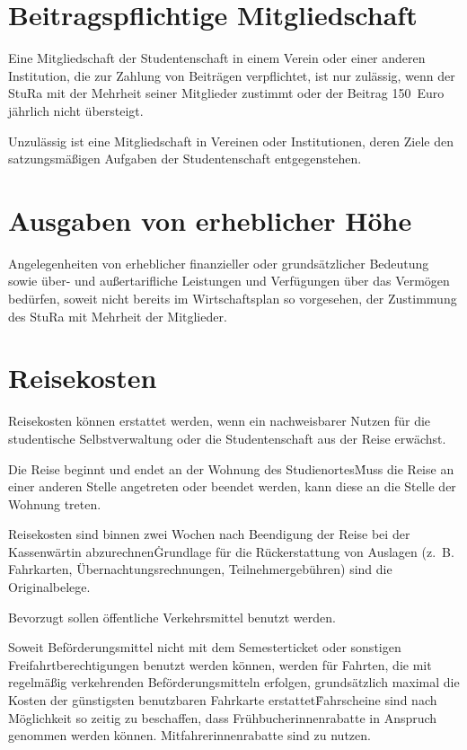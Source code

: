 \begin{multicols}{2}
\section{Beitragspflichtige Mitgliedschaft}

\Abs \Satz Eine Mitgliedschaft der Studentenschaft in einem Verein oder einer anderen Institution, die zur Zahlung von Beiträgen verpflichtet, ist nur zulässig, wenn der StuRa mit der Mehrheit seiner Mitglieder zustimmt oder der Beitrag 150~Euro jährlich nicht übersteigt.

\Abs \Satz Unzulässig ist eine Mitgliedschaft in Vereinen oder Institutionen, deren Ziele den satzungsmäßigen Aufgaben der Studentenschaft entgegenstehen.



\section{Ausgaben von erheblicher Höhe}

\Abs \Satz Angelegenheiten von erheblicher finanzieller oder grundsätzlicher Bedeutung sowie über- und außertarifliche Leistungen und Verfügungen über das Vermögen bedürfen, soweit nicht bereits im Wirtschaftsplan so vorgesehen, der Zustimmung des StuRa mit Mehrheit der Mitglieder.



\section{Reisekosten}

\Abs \Satz Reisekosten können erstattet werden, wenn ein nachweisbarer Nutzen für die studentische Selbstverwaltung oder die Studentenschaft aus der Reise erwächst.

\Abs \Satz Die Reise beginnt und endet an der Wohnung des Studienortes\. Muss die Reise an einer anderen Stelle angetreten oder beendet werden, kann diese an die Stelle der Wohnung treten.

\Abs \Satz Reisekosten sind binnen zwei Wochen nach Beendigung der Reise bei der Kassenwärtin abzurechnen\. Grundlage für die Rückerstattung von Auslagen (z.~B. Fahrkarten, Übernachtungsrechnungen, Teilnehmergebühren) sind die Originalbelege.

\Abs \Satz Bevorzugt sollen öffentliche Verkehrsmittel benutzt werden.

\Abs \Satz Soweit Beförderungsmittel nicht mit dem Semesterticket oder sonstigen Freifahrtberechtigungen benutzt werden können, werden für Fahrten, die mit regelmäßig verkehrenden Beförderungsmitteln erfolgen, grundsätzlich maximal die Kosten der günstigsten benutzbaren Fahrkarte erstattet\. Fahrscheine sind nach Möglichkeit so zeitig zu beschaffen, dass Frühbucherinnenrabatte in Anspruch genommen werden können. Mitfahrerinnenrabatte sind zu nutzen.


\end{multicols}
